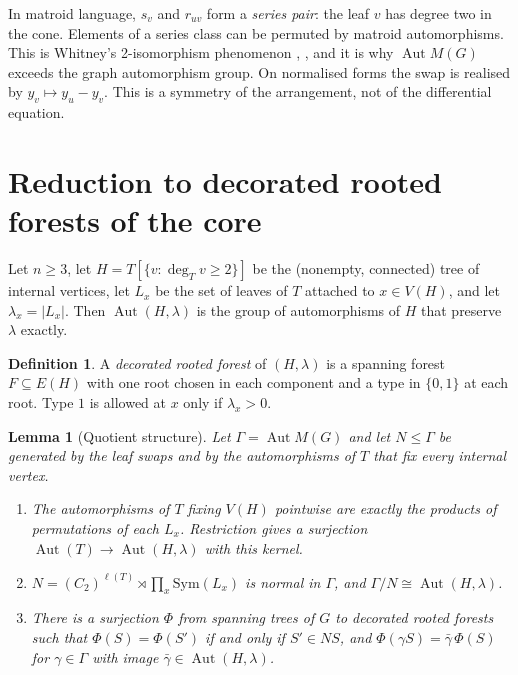 \documentclass[11pt,a4paper]{article}
\newtheorem{lemma}[theorem]{Lemma}
\theoremstyle{definition}
\newtheorem{definition}[theorem]{Definition}
\theoremstyle{remark}
\newcommand{\Aut}{\operatorname{Aut}}
\begin{document}
In matroid language, $s_v$ and $r_{uv}$ form a \emph{series pair}: the leaf $v$ has degree two in the cone. Elements of a series class can be permuted by matroid automorphisms. This is Whitney's 2-isomorphism phenomenon \cite{lv:Whitney1933}, \cite[\S5.3]{lv:Oxley2011}, and it is why $\Aut M(G)$ exceeds the graph automorphism group. On normalised forms the swap is realised by $y_v\mapsto y_u-y_v$. This is a symmetry of the arrangement, not of the differential equation.

\section{Reduction to decorated rooted forests of the core}
\label{lv:sec:core}

Let $n\geq3$, let $H=T[\{v:\deg_T v\geq2\}]$ be the (nonempty, connected) tree of internal vertices, let $L_x$ be the set of leaves of $T$ attached to $x\in V(H)$, and let $\lambda_x=|L_x|$. Then $\Aut(H,\lambda)$ is the group of automorphisms of $H$ that preserve $\lambda$ exactly.

\begin{definition}
A \emph{decorated rooted forest} of $(H,\lambda)$ is a spanning forest $F\subseteq E(H)$ with one root chosen in each component and a type in $\{0,1\}$ at each root. Type $1$ is allowed at $x$ only if $\lambda_x>0$.
\end{definition}

\begin{lemma}[Quotient structure]
\label{lv:lem:quotient}
Let $\Gamma=\Aut M(G)$ and let $N\leq\Gamma$ be generated by the leaf swaps and by the automorphisms of $T$ that fix every internal vertex.
\begin{enumerate}
\item The automorphisms of $T$ fixing $V(H)$ pointwise are exactly the products of permutations of each $L_x$. Restriction gives a surjection $\Aut(T)\to\Aut(H,\lambda)$ with this kernel.
\item $N=(C_2)^{\ell(T)}\rtimes\prod_x\mathrm{Sym}(L_x)$ is normal in $\Gamma$, and $\Gamma/N\cong\Aut(H,\lambda)$.
\item There is a surjection $\Phi$ from spanning trees of $G$ to decorated rooted forests such that $\Phi(S)=\Phi(S')$ if and only if $S'\in N S$, and $\Phi(\gamma S)=\bar\gamma\,\Phi(S)$ for $\gamma\in\Gamma$ with image $\bar\gamma\in\Aut(H,\lambda)$.
\end{enumerate}
\end{lemma}
\end{document}
